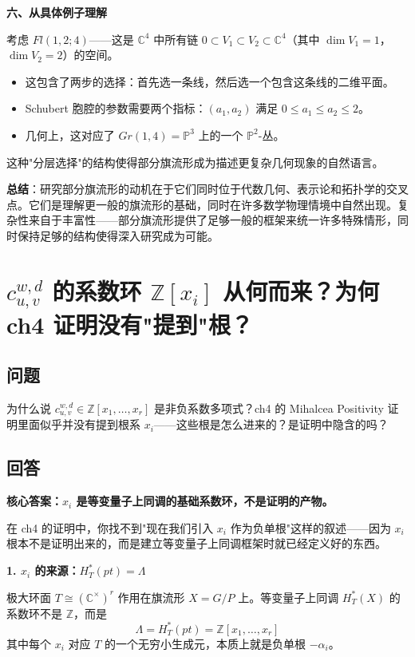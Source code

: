 \textbf{六、从具体例子理解}

考虑 $Fl(1, 2; 4)$——这是 $\mathbb{C}^4$ 中所有链 $0 \subset V_1 \subset V_2 \subset \mathbb{C}^4$（其中 $\dim V_1 = 1$，$\dim V_2 = 2$）的空间。

\begin{itemize}
\item 这包含了两步的选择：首先选一条线，然后选一个包含这条线的二维平面。
\item Schubert 胞腔的参数需要两个指标：$(a_1, a_2)$ 满足 $0 \leq a_1 \leq a_2 \leq 2$。
\item 几何上，这对应了 $Gr(1, 4) = \mathbb{P}^3$ 上的一个 $\mathbb{P}^2$-丛。
\end{itemize}

这种"分层选择"的结构使得部分旗流形成为描述更复杂几何现象的自然语言。

\textbf{总结}：研究部分旗流形的动机在于它们同时位于代数几何、表示论和拓扑学的交叉点。它们是理解更一般的旗流形的基础，同时在许多数学物理情境中自然出现。复杂性来自于丰富性——部分旗流形提供了足够一般的框架来统一许多特殊情形，同时保持足够的结构使得深入研究成为可能。

\section{$c_{u,v}^{w,d}$ 的系数环 $\mathbb{Z}[x_i]$ 从何而来？为何 ch4 证明没有"提到"根？}\label{sec:cuwwd-ring-origin}
\subsection{问题}
为什么说 $c_{u,v}^{w,d} \in \mathbb{Z}[x_1, \ldots, x_r]$ 是非负系数多项式？ch4 的 Mihalcea Positivity 证明里面似乎并没有提到根系 $x_i$——这些根是怎么进来的？是证明中隐含的吗？

\subsection{回答}
\textbf{核心答案：$x_i$ 是等变量子上同调的基础系数环，不是证明的产物。}

在 ch4 的证明中，你找不到"现在我们引入 $x_i$ 作为负单根"这样的叙述——因为 $x_i$ 根本不是证明出来的，而是建立等变量子上同调框架时就已经定义好的东西。

\textbf{1. $x_i$ 的来源：$H_T^*(pt) = \Lambda$}

极大环面 $T \cong (\mathbb{C}^\times)^r$ 作用在旗流形 $X = G/P$ 上。等变量子上同调 $H_T^*(X)$ 的系数环不是 $\mathbb{Z}$，而是
$$\Lambda = H_T^*(pt) = \mathbb{Z}[x_1, \ldots, x_r]$$
其中每个 $x_i$ 对应 $T$ 的一个无穷小生成元，本质上就是负单根 $-\alpha_i$。


